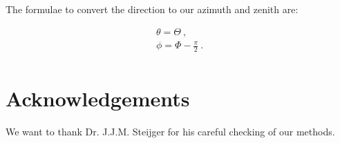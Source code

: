 The formulae to convert the \corsika direction to our azimuth and zenith
are:

\begin{equation}
    \begin{array}{l}
        \theta = \Theta \ , \\
        \phi = \Phi - \frac{\pi}{2} \ . \\
    \end{array}
\end{equation}


\section{Acknowledgements}

We want to thank Dr. J.J.M. Steijger for his careful checking of our
methods.
